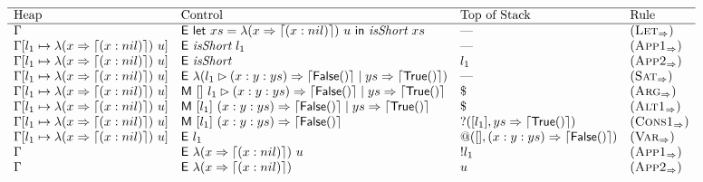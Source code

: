 \begin{figure*}
    \[
        \begin{array}{llll}
            \hline
            \text{Heap}                             & \text{Control}                                             & \text{Top of Stack}                      & \text{Rule}            \\
            \hline
            \Gamma                                  & \textsf{E}~\textsf{let}~xs = \lambda(x \Rightarrow \left\lceil (x : nil)\right\rceil)~u~\textsf{in}~\textit{isShort}~xs & \text{---}                               & (\textsc{Let}_{\Rightarrow})      \\
            \Gamma[l_1 \mapsto \lambda(x \Rightarrow \left\lceil (x : nil)\right\rceil)~u]
                                                    & \textsf{E}~\textit{isShort}~l_1                                 & \text{---}                               & (\textsc{App1}_{\Rightarrow})     \\
            \Gamma[l_1 \mapsto \lambda(x \Rightarrow \left\lceil (x : nil)\right\rceil)~u] & \textsf{E}~\textit{isShort}                                            & l_1                                      & (\textsc{App2}_{\Rightarrow})     \\
            \Gamma[l_1 \mapsto \lambda(x \Rightarrow \left\lceil (x : nil)\right\rceil)~u] & \textsf{E}~\lambda(l_1\rhd (x : y : ys) \Rightarrow \left\lceil \textsf{False}{}(\right)\rceil \mid ys \Rightarrow \left\lceil \textsf{True}{}(\right)\rceil)              & \text{---}                               & (\textsc{Sat}_{\Rightarrow})      \\
            \Gamma[l_1 \mapsto \lambda(x \Rightarrow \left\lceil (x : nil)\right\rceil)~u] & \textsf{M}~[]~l_1\rhd (x : y : ys) \Rightarrow \left\lceil \textsf{False}{}(\right)\rceil \mid ys \Rightarrow \left\lceil \textsf{True}{}(\right)\rceil                   & \$                                       & (\textsc{Arg}_{\Rightarrow})      \\
            \Gamma[l_1 \mapsto \lambda(x \Rightarrow \left\lceil (x : nil)\right\rceil)~u] & \textsf{M}~[l_1]~(x : y : ys) \Rightarrow \left\lceil \textsf{False}{}(\right)\rceil \mid ys \Rightarrow \left\lceil \textsf{True}{}(\right)\rceil                                & \$                                       & (\textsc{Alt1}_{\Rightarrow})     \\
            \Gamma[l_1 \mapsto \lambda(x \Rightarrow \left\lceil (x : nil)\right\rceil)~u] & \textsf{M}~[l_1]~(x : y : ys) \Rightarrow \left\lceil \textsf{False}{}(\right)\rceil          & ?([l_1],ys \Rightarrow \left\lceil \textsf{True}{}(\right)\rceil)         & (\textsc{Cons1}_{\Rightarrow})    \\
            \Gamma[l_1 \mapsto \lambda(x \Rightarrow \left\lceil (x : nil)\right\rceil)~u] & \textsf{E}~l_1                                                 & @([],(x : y : ys) \Rightarrow \left\lceil \textsf{False}{}(\right)\rceil) & (\textsc{Var}_{\Rightarrow})      \\
            \Gamma                                  & \textsf{E}~\lambda(x \Rightarrow \left\lceil (x : nil)\right\rceil)~u                                 & !l_1                                     & (\textsc{App1}_{\Rightarrow})     \\
            \Gamma                                  & \textsf{E}~\lambda(x \Rightarrow \left\lceil (x : nil)\right\rceil)                                          & u                                        & (\textsc{App2}_{\Rightarrow})     \\

\end{array}\]
\end{figure*}

